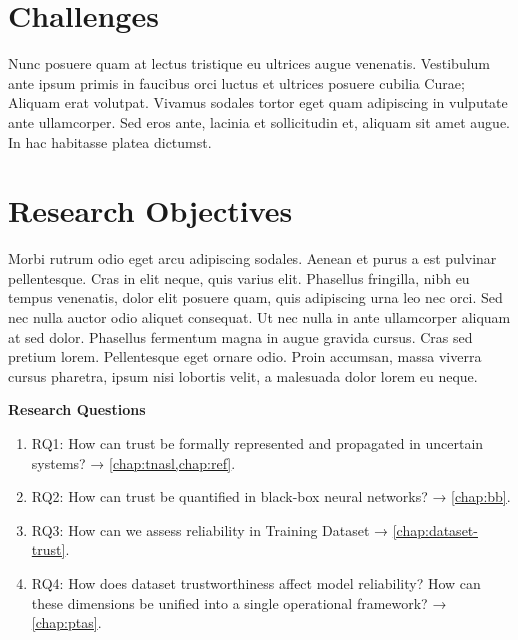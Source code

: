 \section{Challenges}

Nunc posuere quam at lectus tristique eu ultrices augue venenatis. Vestibulum ante ipsum primis in faucibus orci luctus et ultrices posuere cubilia Curae; Aliquam erat volutpat. Vivamus sodales tortor eget quam adipiscing in vulputate ante ullamcorper. Sed eros ante, lacinia et sollicitudin et, aliquam sit amet augue. In hac habitasse platea dictumst.


\section{Research Objectives}
Morbi rutrum odio eget arcu adipiscing sodales. Aenean et purus a est pulvinar pellentesque. Cras in elit neque, quis varius elit. Phasellus fringilla, nibh eu tempus venenatis, dolor elit posuere quam, quis adipiscing urna leo nec orci. Sed nec nulla auctor odio aliquet consequat. Ut nec nulla in ante ullamcorper aliquam at sed dolor. Phasellus fermentum magna in augue gravida cursus. Cras sed pretium lorem. Pellentesque eget ornare odio. Proin accumsan, massa viverra cursus pharetra, ipsum nisi lobortis velit, a malesuada dolor lorem eu neque.

\textbf{Research Questions}
\begin{enumerate}
    \item RQ1: How can trust be formally represented and propagated in uncertain systems? → \cref{chap:tnasl,chap:ref}.
    \item RQ2: How can trust be quantified in black-box neural networks? → \cref{chap:bb}.
    \item RQ3: How can we assess reliability in Training Dataset → \cref{chap:dataset-trust}.
    \item RQ4: How does dataset trustworthiness affect model reliability? How can these dimensions be unified into a single operational framework? → \cref{chap:ptas}.
\end{enumerate}


